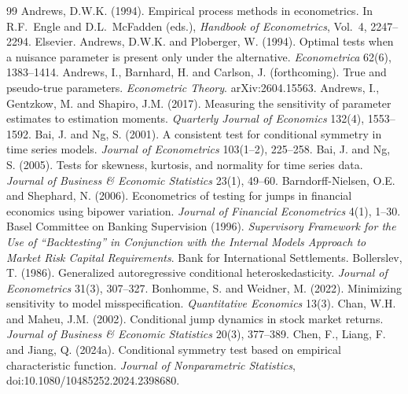 \documentclass[11pt,a4paper]{article}
\theoremstyle{definition}
\theoremstyle{remark}
\begin{document}
\begin{thebibliography}{99}
 Andrews, D.W.K. (1994). Empirical process methods in econometrics. In R.F.~Engle and D.L.~McFadden (eds.), \emph{Handbook of Econometrics}, Vol.~4, 2247--2294. Elsevier.
 Andrews, D.W.K. and Ploberger, W. (1994). Optimal tests when a nuisance parameter is present only under the alternative. \emph{Econometrica} 62(6), 1383--1414.
 Andrews, I., Barnhard, H. and Carlson, J. (forthcoming). True and pseudo-true parameters. \emph{Econometric Theory}. arXiv:2604.15563.
 Andrews, I., Gentzkow, M. and Shapiro, J.M. (2017). Measuring the sensitivity of parameter estimates to estimation moments. \emph{Quarterly Journal of Economics} 132(4), 1553--1592.
 Bai, J. and Ng, S. (2001). A consistent test for conditional symmetry in time series models. \emph{Journal of Econometrics} 103(1--2), 225--258.
 Bai, J. and Ng, S. (2005). Tests for skewness, kurtosis, and normality for time series data. \emph{Journal of Business \& Economic Statistics} 23(1), 49--60.
 Barndorff-Nielsen, O.E. and Shephard, N. (2006). Econometrics of testing for jumps in financial economics using bipower variation. \emph{Journal of Financial Econometrics} 4(1), 1--30.
 Basel Committee on Banking Supervision (1996). \emph{Supervisory Framework for the Use of ``Backtesting'' in Conjunction with the Internal Models Approach to Market Risk Capital Requirements}. Bank for International Settlements.
 Bollerslev, T. (1986). Generalized autoregressive conditional heteroskedasticity. \emph{Journal of Econometrics} 31(3), 307--327.
 Bonhomme, S. and Weidner, M. (2022). Minimizing sensitivity to model misspecification. \emph{Quantitative Economics} 13(3).
 Chan, W.H. and Maheu, J.M. (2002). Conditional jump dynamics in stock market returns. \emph{Journal of Business \& Economic Statistics} 20(3), 377--389.
 Chen, F., Liang, F. and Jiang, Q. (2024a). Conditional symmetry test based on empirical characteristic function. \emph{Journal of Nonparametric Statistics}, doi:10.1080/10485252.2024.2398680.

\end{thebibliography}
\end{document}
